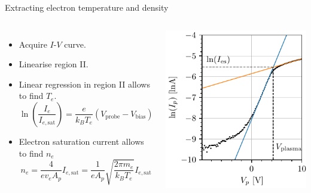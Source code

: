\documentclass[10pt]{beamer}
\newcommand{\electronsaturationcurrent}[0]{\ensuremath{I_{e,{\mathrm{sat}}}}}
\newcommand{\biasvoltage}{\ensuremath{V_{\mathrm{bias}}}}
\newcommand{\probevoltage}{\ensuremath{V_{\mathrm{probe}}}}
\begin{document}
\begin{frame}{Extracting electron temperature and density}
    \begin{columns}
        \begin{itemize}
            \item Acquire $I$-$V$ curve.
            \item Linearise region II.
            \item Linear regression in region II allows to find $T_e$.
                \begin{equation*}
                    \ln\left(\frac{I_e}{\electronsaturationcurrent} \right) = \frac{e}{k_B T_e}(\probevoltage - \biasvoltage)
                \end{equation*}
            \item Electron saturation current allows to find $n_e$
                \begin{equation*}
                    n_e = \frac{4}{e v_e A_p} \electronsaturationcurrent = \frac{1}{e A_p} \sqrt{\frac{2 \pi m_e}{k_B T_e}} \electronsaturationcurrent
                \end{equation*}
        \end{itemize}

         
        

        \includegraphics[scale=1]{../figures/IV_fit.pdf}
    \end{columns}
\end{frame}
\end{document}

